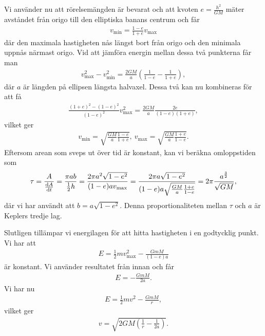 Vi använder nu att rörelsemängden är bevarat och att kvoten $e = \frac{h^2}{GM}$ mäter avståndet från origo till den elliptiska banans centrum och får
\begin{align*}
	v_{\text{min}} = \frac{1 - e}{1 + e}v_{\text{max}}
\end{align*}
där den maximala hastigheten nås längst bort från origo och den minimala uppnås närmast origo. Vid att jämföra energin mellan dessa två punkterna får man
\begin{align*}
	v_{\text{max}}^2 - v_{\text{min}}^2 = \frac{2GM}{a}\left(\frac{1}{1 - e} - \frac{1}{1 + e}\right),
\end{align*}
där $a$ är längden på ellipsen längsta halvaxel. Dessa två kan nu kombineras för att få
\begin{align*}
	\frac{(1 + e)^2 - (1 - e)^2}{(1 - e)^2}v_{\text{max}}^2 = \frac{2GM}{a}\frac{2e}{(1-e)(1 + e)},
\end{align*}
vilket ger
\begin{align*}
	v_{\text{min}} = \sqrt{\frac{GM}{a}\frac{1 - e}{1 + e}},\ v_{\text{max}} = \sqrt{\frac{GM}{a}\frac{1 + e}{1 - e}}.
\end{align*}
Eftersom arean som sveps ut över tid är konstant, kan vi beräkna omloppstiden som
\begin{align*}
	\tau = \frac{A}{\dv{A}{t}} = \frac{\pi ab}{\frac{1}{2}h} = \frac{2\pi a^2\sqrt{1 - e^2}}{(1 - e)av_{\text{max}}} = \frac{2\pi a\sqrt{1 - e^2}}{(1 - e)a\sqrt{\frac{GM}{a}\frac{1 + e}{1 - e}}} = 2\pi\frac{a^{\frac{3}{2}}}{\sqrt{GM}},
\end{align*}
där vi har användt att $b = a\sqrt{1 - e^2}$. Denna proportionaliteten mellan $\tau$ och $a$ är Keplers tredje lag.

Slutligen tillämpar vi energilagen för att hitta hastigheten i en godtycklig punkt. Vi har att
\begin{align*}
	E = \frac{1}{2}mv_{\text{max}}^2 - \frac{GmM}{(1 - e)a}
\end{align*}
är konstant. Vi använder resultatet från innan och får
\begin{align*}
	E = -\frac{GmM}{2a}.
\end{align*}
Vi har nu
\begin{align*}
	E = \frac{1}{2}mv^2 - \frac{GmM}{r},
\end{align*}
vilket ger
\begin{align*}
	v = \sqrt{2GM\left(\frac{1}{r} - \frac{1}{2a}\right)}.
\end{align*}